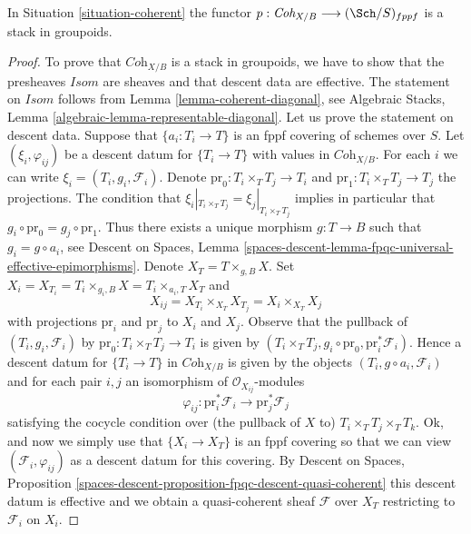 \begin{lemma}
\label{lemma-coherent-stack}
In Situation \ref{situation-coherent} the functor
$p : \textit{Coh}_{X/B} \longrightarrow (\Sch/S)_{fppf}$
is a stack in groupoids.
\end{lemma}

\begin{proof}
To prove that $\textit{Coh}_{X/B}$ is a stack in groupoids, we have to show
that the presheaves $\mathit{Isom}$ are sheaves and that descent data are
effective. The statement on $\mathit{Isom}$ follows from
Lemma \ref{lemma-coherent-diagonal}, see
Algebraic Stacks, Lemma \ref{algebraic-lemma-representable-diagonal}.
Let us prove the statement on descent data.
Suppose that $\{a_i : T_i \to T\}$ is an fppf covering of schemes over $S$.
Let $(\xi_i, \varphi_{ij})$ be a descent datum for $\{T_i \to T\}$
with values in $\textit{Coh}_{X/B}$.
For each $i$ we can write $\xi_i = (T_i, g_i, \mathcal{F}_i)$.
Denote $\text{pr}_0 : T_i \times_T T_j \to T_i$ and
$\text{pr}_1 : T_i \times_T T_j \to T_j$ the projections.
The condition that $\xi_i|_{T_i \times_T T_j} = \xi_j|_{T_i \times_T T_j}$
implies in particular that $g_i \circ \text{pr}_0 = g_j \circ \text{pr}_1$.
Thus there exists a unique morphism $g : T \to B$ such that
$g_i = g \circ a_i$, see
Descent on Spaces, Lemma
\ref{spaces-descent-lemma-fpqc-universal-effective-epimorphisms}.
Denote $X_T = T \times_{g, B} X$. Set
$X_i = X_{T_i} = T_i \times_{g_i, B} X = T_i \times_{a_i, T} X_T$
and
$$
X_{ij} = X_{T_i} \times_{X_T} X_{T_j} = X_i \times_{X_T} X_j
$$
with projections $\text{pr}_i$ and $\text{pr}_j$ to $X_i$ and $X_j$.
Observe that the pullback of $(T_i, g_i, \mathcal{F}_i)$
by $\text{pr}_0 : T_i \times_T T_j \to T_i$ is given by
$(T_i \times_T T_j, g_i \circ \text{pr}_0, \text{pr}_i^*\mathcal{F}_i)$.
Hence a descent datum for $\{T_i \to T\}$ in $\textit{Coh}_{X/B}$
is given by the objects $(T_i, g \circ a_i, \mathcal{F}_i)$
and for each pair $i, j$ an isomorphism of $\mathcal{O}_{X_{ij}}$-modules
$$
\varphi_{ij} :
\text{pr}_i^*\mathcal{F}_i \longrightarrow \text{pr}_j^*\mathcal{F}_j
$$
satisfying the cocycle condition over (the pullback of $X$ to)
$T_i \times_T T_j \times_T T_k$.
Ok, and now we simply use that $\{X_i \to X_T\}$ is an fppf covering
so that we can view $(\mathcal{F}_i, \varphi_{ij})$ as a descent datum
for this covering. By
Descent on Spaces, Proposition
\ref{spaces-descent-proposition-fpqc-descent-quasi-coherent}
this descent datum is effective and we obtain a quasi-coherent
sheaf $\mathcal{F}$ over $X_T$ restricting to $\mathcal{F}_i$ on $X_i$.

\end{proof}
